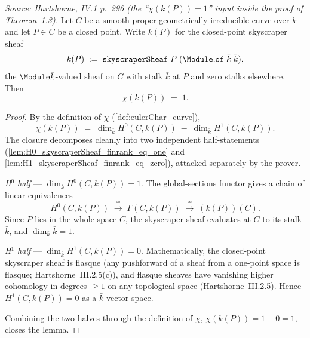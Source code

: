 \begin{lemma}
  \label{lem:euler_char_skyscraperSheaf}
  \textit{Source: Hartshorne, IV.1 p.~296 (the ``\(\chi(k(P)) = 1\)''
  input inside the proof of Theorem~1.3).}
  Let \(C\) be a smooth proper geometrically irreducible curve over
  \(\bar k\) and let \(P \in C\) be a closed point. Write \(k(P)\) for
  the closed-point skyscraper sheaf
  \[
    k(P) \;:=\; \mathtt{skyscraperSheaf}\;P\;
    (\Module.\mathtt{of}\;\bar k\;\bar k),
  \]
  the \(\Module \bar k\)-valued sheaf on \(C\) with stalk \(\bar k\) at
  \(P\) and zero stalks elsewhere. Then
  \[
    \chi(k(P)) \;=\; 1.
  \]
\end{lemma}

\begin{proof}
  By the definition of \(\chi\)
  (\cref{def:eulerChar_curve}),
  \[
    \chi(k(P)) \;=\; \dim_{\bar k} H^0(C, k(P))
    \;-\; \dim_{\bar k} H^1(C, k(P)).
  \]
  The closure decomposes cleanly into two independent half-statements
  (\cref{lem:H0_skyscraperSheaf_finrank_eq_one} and
  \cref{lem:H1_skyscraperSheaf_finrank_eq_zero}), attacked separately
  by the prover.

  \emph{H\(^0\) half} — \(\dim_{\bar k} H^0(C, k(P)) = 1\).
  The global-sections functor gives a chain of linear equivalences
  \[
    H^0(C, k(P))
    \;\xrightarrow{\;\cong\;}\;
    \Gamma(C, k(P))
    \;\xrightarrow{\;\cong\;}\;
    (k(P))(C).
  \]
  Since \(P\) lies in the whole space \(C\), the skyscraper sheaf evaluates
  at \(C\) to its stalk \(\bar k\), and \(\dim_{\bar k} \bar k = 1\).

  \emph{H\(^1\) half} — \(\dim_{\bar k} H^1(C, k(P)) = 0\).
  Mathematically, the closed-point skyscraper sheaf is flasque (any
  pushforward of a sheaf from a one-point space is flasque;
  Hartshorne~III.2.5(c)), and flasque sheaves have vanishing higher
  cohomology in degrees \(\geq 1\) on any topological space
  (Hartshorne~III.2.5). Hence \(H^1(C, k(P)) = 0\) as a
  \(\bar k\)-vector space.

  Combining the two halves through the definition of \(\chi\),
  \(\chi(k(P)) = 1 - 0 = 1\), closes the lemma.
\end{proof}

